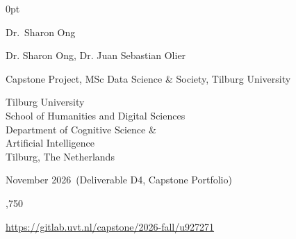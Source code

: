 \documentclass[11pt,a4paper]{article}
\newcommand{\myStudentNumber}{2103939}
\newcommand{\myCommittee}{Dr.\ Sharon Ong}
\newcommand{\myDate}{11 November 2026}
\newcommand{\myStage}{Deliverable D4, Capstone Portfolio}
\newcommand{\repourl}{https://gitlab.uvt.nl/capstone/2026-fall/u927271}
\newlength{\backindent}\setlength{\backindent}{24pt}
\newlength{\backtopskip}\setlength{\backtopskip}{-15.7pt}
\begin{document}
\thispagestyle{empty}
\begin{addmargin}[\backindent]{0pt}
\noindent
\vspace*{\backtopskip}

\noindent{}

\vspace{7.5pt}\noindent\myStudentNumber

\vspace{15.1pt}

\noindent{}

\vspace{7.5pt}\noindent\myCommittee

\vspace{15.1pt}

\noindent{}

\vspace{7.5pt}\noindent Dr. Sharon Ong, Dr. Juan Sebastian Olier

\vspace{15.1pt}

\noindent{}

\vspace{7.5pt}\noindent Capstone Project, MSc Data Science \& Society, Tilburg University

\vspace{15.1pt}

\noindent{}

\vspace{7.5pt}\noindent Tilburg University\\
School of Humanities and Digital Sciences\\
Department of Cognitive Science \&\\
Artificial Intelligence\\
Tilburg, The Netherlands

\vspace{15.1pt}

\noindent{}

\vspace{7.5pt}\noindent\myDate\ (\myStage)

\vspace{15.1pt}

\noindent{}

\vspace{7.5pt},750

\vspace{15.1pt}

\noindent{}

\vspace{7.5pt}\noindent\url{\repourl}
\end{addmargin}
\end{document}
